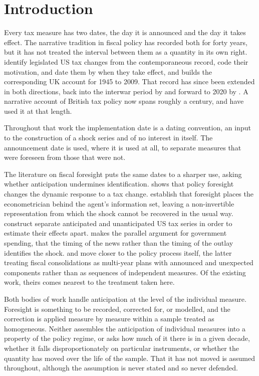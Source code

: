 \documentclass[11pt,a4paper]{article}
\begin{document}
\newpage

\section{Introduction}

Every tax measure has two dates, the day it is announced and the day it takes effect. The narrative tradition in fiscal policy has recorded both for forty years, but it has not treated the interval between them as a quantity in its own right. \citet{romer2010} identify legislated US tax changes from the
contemporaneous record, code their motivation, and date them by when they take effect, and
\citet{cloyne2013} builds the corresponding UK account for 1945 to 2009. That record has since been
extended in both directions, back into the interwar period by \citet{cloyne2023} and forward to 2020 by \citet{hurtgen2024}. A narrative account of British tax policy now spans roughly a century, and \citet{cloyne2025} have used it at that length.

Throughout that work the implementation date is a dating convention, an input to the construction of a shock series and of no interest in itself. The announcement date is used, where it is used at all, to separate measures that were foreseen from those that were not.

The literature on fiscal foresight puts the same dates to a sharper use, asking whether anticipation
undermines identification. \citet{yang2005} shows that policy foresight changes the dynamic response to a tax change. \citet{leeper2013} establish that foresight places the econometrician behind
the agent's information set, leaving a non-invertible representation from which the shock cannot be
recovered in the usual way. \citet{mertens2011,mertens2012} construct separate anticipated and
unanticipated US tax series in order to estimate their effects apart. \citet{ramey2011} makes the parallel argument for government spending, that the timing of the news rather than the timing of
the outlay identifies the shock. \citet{favero2012} and \citet{alesina2015} move closer to the
policy process itself, the latter treating fiscal consolidations as multi-year plans with announced
and unexpected components rather than as sequences of independent measures. Of the existing work,
theirs comes nearest to the treatment taken here.

Both bodies of work handle anticipation at the level of the individual measure. Foresight is
something to be recorded, corrected for, or modelled, and the correction is applied measure by
measure within a sample treated as homogeneous. Neither assembles the anticipation of individual
measures into a property of the policy regime, or asks how much of it there is in a given decade,
whether it falls disproportionately on particular instruments, or whether the quantity has moved
over the life of the sample. That it has not moved is assumed throughout, although the assumption is
never stated and so never defended.
\end{document}

